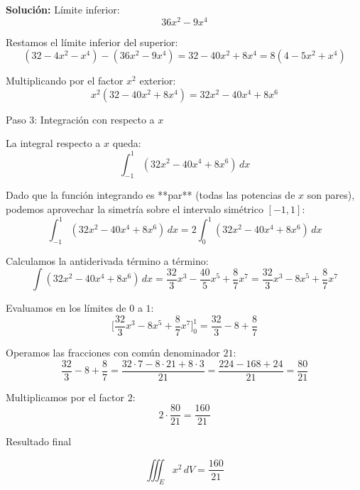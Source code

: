 \documentclass[12pt,a4paper]{report}
\newcommand{\solutionname}{Solución:}
\newenvironment{solution}{
 	\par\noindent\textbf{\color{structurecolor}\solutionname}
 	\color{black!90}}{\hfill\quad\par}
\begin{document}
\begin{solution}
 Límite inferior:
  $$36x^2 - 9x^4$$

Restamos el límite inferior del superior:
$$(32 - 4x^2 - x^4) - (36x^2 - 9x^4) = 32 - 40x^2 + 8x^4 = 8(4 - 5x^2 + x^4)$$

Multiplicando por el factor $x^2$ exterior:
$$x^2(32 - 40x^2 + 8x^4) = 32x^2 - 40x^4 + 8x^6$$



 Paso 3: Integración con respecto a $x$

La integral respecto a $x$ queda:
$$\int_{-1}^{1} (32x^2 - 40x^4 + 8x^6)\,dx$$

Dado que la función integrando es **par** (todas las potencias de $x$ son pares), podemos aprovechar la simetría sobre el intervalo simétrico $[-1, 1]$:
$$\int_{-1}^{1} (32x^2 - 40x^4 + 8x^6)\,dx = 2 \int_{0}^{1} (32x^2 - 40x^4 + 8x^6)\,dx$$

Calculamos la antiderivada término a término:
$$\int (32x^2 - 40x^4 + 8x^6)\,dx = \frac{32}{3}x^3 - \frac{40}{5}x^5 + \frac{8}{7}x^7 = \frac{32}{3}x^3 - 8x^5 + \frac{8}{7}x^7$$

Evaluamos en los límites de $0$ a $1$:
$$\Big[ \frac{32}{3}x^3 - 8x^5 + \frac{8}{7}x^7 \Big]_0^1 = \frac{32}{3} - 8 + \frac{8}{7}$$

Operamos las fracciones con común denominador $21$:
$$\frac{32}{3} - 8 + \frac{8}{7} = \frac{32 \cdot 7 - 8 \cdot 21 + 8 \cdot 3}{21} = \frac{224 - 168 + 24}{21} = \frac{80}{21}$$

Multiplicamos por el factor $2$:
$$2 \cdot \frac{80}{21} = \frac{160}{21}$$


 Resultado final

$$\iiint_E x^2\,dV = \frac{160}{21}$$

\end{solution}
\end{document}
